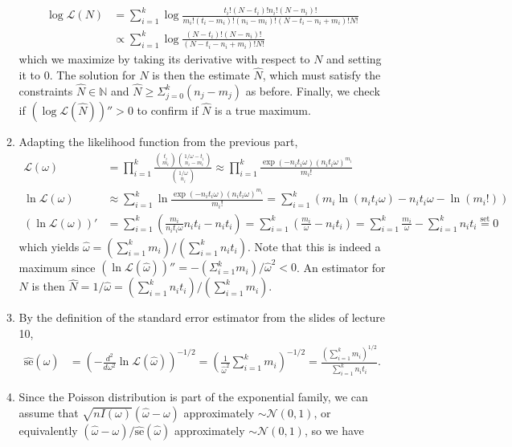 \documentclass[12pt]{article}
\newcommand{\se}{\text{se}}
\newcommand{\h}[1]{\hat{#1}}
\begin{document}
\begin{enumerate}
\begin{enumerate}
\begin{align*}
            \log\mathcal{L}(N) &= \sum_{i=1}^k \log\frac{t_i!(N-t_i)!n_i!(N-n_i)!}{m_i!(t_i-m_i)!(n_i-m_i)!(N-t_i-n_i+m_i)!N!}\\
            &\propto \sum_{i=1}^k \log\frac{(N-t_i)!(N-n_i)!}{(N-t_i-n_i+m_i)!N!}
        \end{align*} which we maximize by taking its derivative with respect to $N$ and setting it to 0. The solution for $N$ is then the estimate $\h{N}$, which must satisfy the constraints $\h{N}\in\mathbb{N}$ and $\h{N}\geq\Sigma_{j=0}^k (n_j-m_j)$ as before. Finally, we check if $(\log\mathcal{L}(\h{N}))''>0$ to confirm if $\h{N}$ is a true maximum.
        \item Adapting the likelihood function from the previous part, \begin{align*}
            \mathcal{L}(\omega) &= \prod_{i=1}^k \frac{\binom{t_i}{m_i}\binom{1/\omega-t_i}{n_i-m_i}}{\binom{1/\omega}{n_i}} \approx \prod_{i=1}^k \frac{\exp(-n_it_i\omega)(n_it_i\omega)^{m_i}}{m_i!}\\
            \ln\mathcal{L}(\omega) &\approx \sum_{i=1}^k \ln\frac{\exp(-n_it_i\omega)(n_it_i\omega)^{m_i}}{m_i!} = \sum_{i=1}^k (m_i\ln(n_it_i\omega)-n_it_i\omega-\ln(m_i!))\\
            (\ln\mathcal{L}(\omega))' &= \sum_{i=1}^k (\frac{m_i}{n_it_i\omega}n_it_i-n_it_i) = \sum_{i=1}^k (\frac{m_i}{\omega}-n_it_i) = \sum_{i=1}^k \frac{m_i}{\omega} - \sum_{i=1}^k n_it_i \overset{\text{set}}{=} 0
        \end{align*} which yields $\h{\omega} = (\sum_{i=1}^k m_i)/(\sum_{i=1}^k n_it_i)$. Note that this is indeed a maximum since $(\ln\mathcal{L}(\h{\omega}))'' = -(\Sigma_{i=1}^k m_i)/\h{\omega}^2 < 0$. An estimator for $N$ is then $\h{N} = 1/\h{\omega} = (\sum_{i=1}^k n_it_i)/(\sum_{i=1}^k m_i)$.
        \item By the definition of the standard error estimator from the slides of lecture 10, \begin{align*}
            \widehat{\se}(\h{\omega}) &= (-\frac{d^2}{d\omega^2} \ln\mathcal{L}(\h{\omega}))^{-1/2} = (\frac{1}{\h{\omega}^2}\sum_{i=1}^k m_i)^{-1/2} = \frac{(\sum_{i=1}^k m_i)^{1/2}}{\sum_{i=1}^k n_it_i}.
        \end{align*}
        \item Since the Poisson distribution is part of the exponential family, we can assume that $\sqrt{nI(\omega)}(\h{\omega}-\omega)$ approximately $\sim \mathcal{N}(0,1)$, or equivalently $(\h{\omega}-\omega)/\widehat{\se}(\h{\omega})$ approximately $\sim \mathcal{N}(0,1)$, so we have \begin{align*}

\end{align*}
\end{enumerate}
\end{enumerate}
\end{document}

